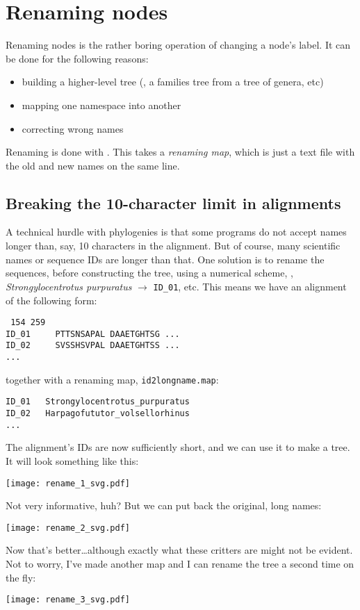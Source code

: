 \section{Renaming nodes}
\label{sct_rename}

Renaming nodes is the rather boring operation of changing a node's label. It
can be done \eg{} for the following reasons:
\begin{itemize}
	\item building a higher-level tree (\ie, a families tree from a tree of genera, etc)
	\item mapping one namespace into another
	\item correcting wrong names
\end{itemize}

Renaming is done with \rename. This takes a \emph{renaming map}, which is just
a text file with the old and new names on the same line.

\subsection{Breaking the 10-character limit in \phylip{} alignments}

A technical hurdle with phylogenies is that some programs do not accept names
longer than, say, 10 characters in the \phylip{} alignment. But of
course, many scientific names or sequence \textsc{ID}s are longer than that.
One solution is to rename the sequences, before constructing the tree, using a
numerical scheme, \eg{}, \textit{Strongylocentrotus purpuratus} $\rightarrow$
\texttt{ID\_01}, etc. This means we have an alignment of the following form:
\begin{verbatim}
 154 259
ID_01     PTTSNSAPAL DAAETGHTSG ...
ID_02     SVSSHSVPAL DAAETGHTSS ...
...
\end{verbatim}
together with a renaming map, \texttt{id2longname.map}:
\begin{verbatim}
ID_01	Strongylocentrotus_purpuratus
ID_02	Harpagofututor_volsellorhinus
...
\end{verbatim}
The alignment's \textsc{ID}s are now sufficiently short, and we can use it to
make a tree. It will look something like this:


\begin{center}
\texttt{[image: rename\_1\_svg.pdf]}
\end{center}

\noindent{}Not very informative, huh? But we can put back the original, long names:


\begin{center}
\texttt{[image: rename\_2\_svg.pdf]}
\end{center}

\noindent{}Now that's better\ldots although exactly what these critters are
might not be evident. Not to worry, I've made another map and I can rename the
tree a second time on the fly:


\begin{center}
\texttt{[image: rename\_3\_svg.pdf]}
\end{center}





